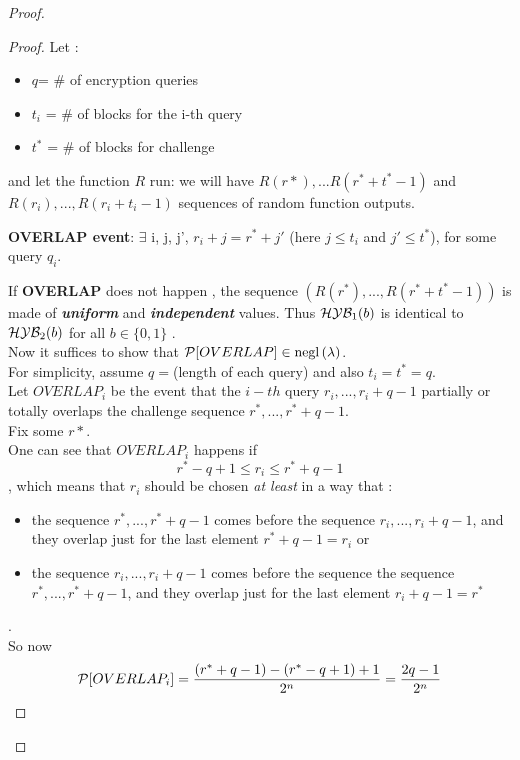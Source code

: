 \begin{proof}
    \begin{proof}
        Let :
        \begin{itemize}
            \item $q$= \# of encryption queries
            \item $t_{i}$ = \# of blocks for the i-th query
            \item $t^{*}$ = \# of blocks for challenge
        \end{itemize}
 and let the function $R$ run: we will have 
 $R(r*), ...R(r^{*}+t^{*}-1)$ and $R(r_{i}), ..., R(r_{i}+t_{i}-1)$ sequences of random
 function outputs.

 \begin{definition}
     \textbf{OVERLAP event}: $\exists$ i, j, j', $r_{i} + j=r^{*} + j'$ (here $j \leq t_{i}$ and $j' \leq t^{*}$), for some query $q_{i}$.
 \end{definition}
 
 If \textbf{OVERLAP}  does not happen , the sequence $(R(r^{*}), ...,
 R(r^{*}+t^{*}-1))$ is made of \textbf{ \textit{uniform} } and \textbf{
 \textit{independent}} values.
 Thus $\H\Y\B_{1}(b)$ is identical to $\H\Y\B_{2}(b)$ for all $b \in \{0,1\}$
 .\\

 Now it suffices to show that $ \P [ OVERLAP ] \in \negl{\lambda}  $.\\

 For simplicity, assume $q=$(length of each query) and also $t_{i}=t^{*}=q$.\\
Let $OVERLAP_{i}$ be the event that the $i-th$ query $r_{i}, ..., r_{i} + q - 1 $ 
partially or totally overlaps the challenge sequence $r^{*}, ..., r^{*} + q - 1 $.\\

Fix some $r*$.\\
One can see that $OVERLAP_{i}$ happens if 
\[
r^{*}-q+1 \leq r_{i} \leq r^{*} + q - 1
\]
, which means that $r_{i}$ should be chosen \textit{at least} in a way that :
\begin{itemize}
    \item the sequence $r^{*}, ..., r^{*} + q - 1 $ comes before the sequence $r_{i},
        ..., r_{i} + q - 1 $, and they overlap just for the last element  $r^{*}
        + q -1 = r_{i}$ or
    \item the sequence $r_{i},..., r_{i} + q - 1 $ comes before the sequence the
        sequence $r^{*}, ..., r^{*} + q - 1 $, and they overlap just for the
        last element $r_{i} + q - 1 = r^{*}$
\end{itemize}.\\
So now
\[
    \P [ OVERLAP_{i} ] = \frac{(r^{*} +q - 1) - (r^{*}-q+1) + 1}{2^{n}} =
    \frac{2q-1}{2^{n}}
\]


\end{proof}
\end{proof}
